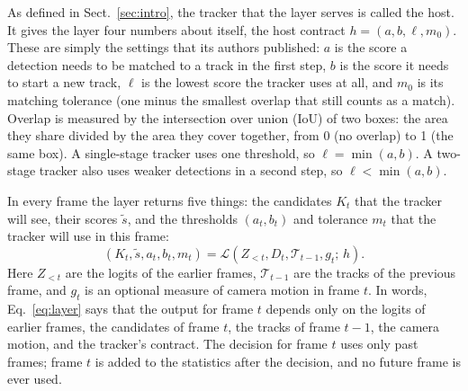\documentclass[pdflatex,sn-mathphys-num,iicol]{sn-jnl}
\begin{document}
As defined in Sect.~\ref{sec:intro}, the tracker that the layer serves is
called the host. It gives the layer four numbers about itself, the host
contract $h=(a,b,\ell,m_0)$. These are simply the settings that its
authors published: $a$ is the score a detection needs to be matched to a
track in the first step, $b$ is the score it needs to start a new track,
$\ell$ is the lowest score the tracker uses at all, and $m_0$ is its matching
tolerance (one minus the smallest overlap that still counts as a match).
Overlap is measured by the intersection over union (IoU) of two boxes: the
area they share divided by the area they cover together, from 0 (no overlap)
to 1 (the same box). A
single-stage tracker uses one threshold, so $\ell=\min(a,b)$. A two-stage
tracker also uses weaker detections in a second step, so
$\ell<\min(a,b)$.

In every frame the layer returns five things: the candidates $K_t$ that the
tracker will see, their scores $\tilde{s}$, and the thresholds $(a_t,b_t)$
and tolerance $m_t$ that the tracker will use in this frame:
\begin{equation}
\left(K_t,\tilde{s},a_t,b_t,m_t\right)=
\mathcal{L}\left(Z_{<t},D_t,\mathcal{T}_{t-1},g_t;\,h\right).
\label{eq:layer}
\end{equation}
Here $Z_{<t}$ are the logits of the earlier frames, $\mathcal{T}_{t-1}$ are
the tracks of the previous frame, and $g_t$ is an optional measure of camera
motion in frame $t$. In words, Eq.~\eqref{eq:layer} says that the output for
frame $t$ depends only on the logits of earlier frames, the candidates of
frame $t$, the tracks of frame $t-1$, the camera motion, and the tracker's
contract. The decision for frame $t$ uses only past frames; frame $t$ is
added to the statistics after the decision, and no future frame is ever
used.
\end{document}
